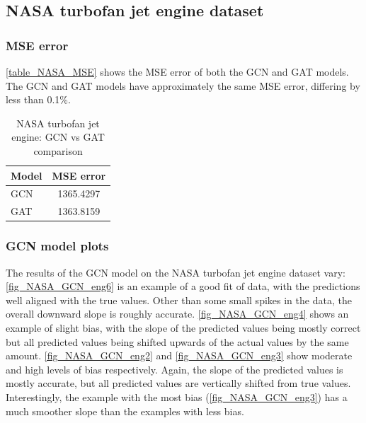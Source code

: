 \documentclass[12pt]{article}
\begin{document}
\subsection{NASA turbofan jet engine dataset} 

\subsubsection{MSE error}

\autoref{table_NASA_MSE} shows the MSE error of both the GCN and GAT models. The GCN and GAT models have approximately the same MSE error, differing by less than 0.1\%. 

\begin{table}[H]
\centering
\caption{NASA turbofan jet engine: GCN vs GAT comparison}
\begin{tabular}{|l|c|}
\hline
\textbf{Model} & \textbf{MSE error}\\
\hline
GCN & 1365.4297  \\
GAT & 1363.8159  \\
\hline
\end{tabular}
\label{table_NASA_MSE}
\end{table}

\subsubsection{GCN model plots}
The results of the GCN model on the NASA turbofan jet engine dataset vary: \autoref{fig_NASA_GCN_eng6} is an example of a good fit of data, with the predictions well aligned with the true values. Other than some small spikes in the data, the overall downward slope is roughly accurate. \autoref{fig_NASA_GCN_eng4} shows an example of slight bias, with the slope of the predicted values being mostly correct but all predicted values being shifted upwards of the actual values by the same amount. \autoref{fig_NASA_GCN_eng2} and \autoref{fig_NASA_GCN_eng3} show moderate and high levels of bias respectively. Again, the slope of the predicted values is mostly accurate, but all predicted values are vertically shifted from true values. Interestingly, the example with the most bias (\autoref{fig_NASA_GCN_eng3}) has a much smoother slope than the examples with less bias. 
\end{document}
